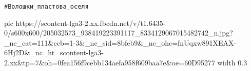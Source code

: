 \verb|#Волошки_пластова_оселя|

\ifcmt
     pic https://scontent-lga3-2.xx.fbcdn.net/v/t1.6435-0/s600x600/205032573_938419223391117_8334129067015482742_n.jpg?_nc_cat=111&ccb=1-3&_nc_sid=8bfeb9&_nc_ohc=fnUqxw891XEAX-6Hj2D&_nc_ht=scontent-lga3-2.xx&tp=7&oh=0fea156f9cebb134aefa958f609baa7e&oe=60D95277
		 width 0.3
\fi

